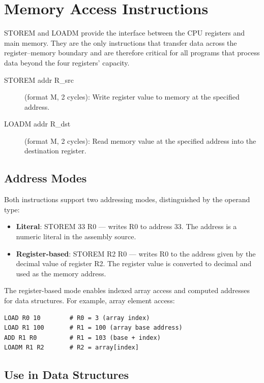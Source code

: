 \documentclass[12pt,a4paper,twoside]{book}
\theoremstyle{trinarytheorem}
\theoremstyle{trinarydefinition}
\newcommand{\code}[1]{\textsf{#1}}
\begin{document}
\chapter{Memory Access Instructions}
\label{ch:memaccess}

STOREM and LOADM provide the interface between the CPU registers and main memory.
They are the only instructions that transfer data across the register--memory boundary
and are therefore critical for all programs that process data beyond the four
registers' capacity.

\begin{description}
    \item[\code{STOREM addr R\_src}] (format M, 2 cycles): Write register value
          to memory at the specified address.
    \item[\code{LOADM addr R\_dst}] (format M, 2 cycles): Read memory value at
          the specified address into the destination register.
\end{description}

\section{Address Modes}

Both instructions support two addressing modes, distinguished by the operand type:
\begin{itemize}
    \item \textbf{Literal}: \code{STOREM 33 R0} --- writes R0 to address 33.
          The address is a numeric literal in the assembly source.
    \item \textbf{Register-based}: \code{STOREM R2 R0} --- writes R0 to the
          address given by the decimal value of register R2. The register value is
          converted to decimal and used as the memory address.
\end{itemize}

The register-based mode enables indexed array access and computed addresses for
data structures. For example, array element access:
\begin{lstlisting}
LOAD R0 10        # R0 = 3 (array index)
LOAD R1 100       # R1 = 100 (array base address)
ADD R1 R0         # R1 = 103 (base + index)
LOADM R1 R2       # R2 = array[index]
\end{lstlisting}

\section{Use in Data Structures}
\end{document}
